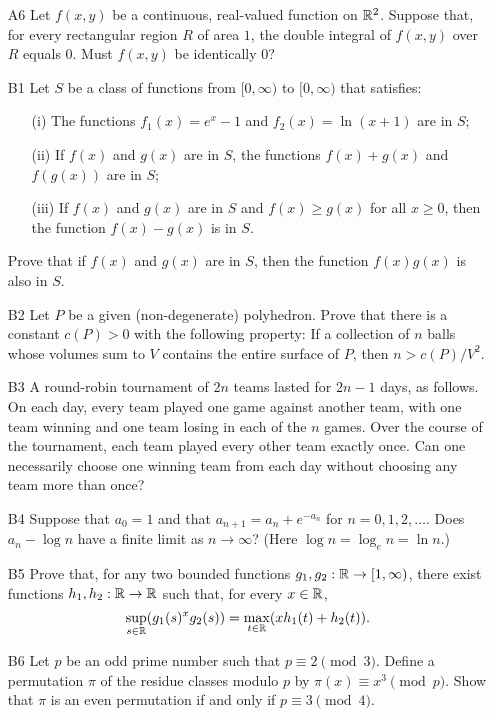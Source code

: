\documentclass[amssymb,twocolumn,pra,10pt,aps]{revtex4-1}
\begin{document}
\begin{itemize}
\item[A6]
Let $f(x,y)$ be a continuous, real-valued function on $\mathbb{R}^2$. Suppose that, for every
rectangular region $R$ of area $1$, the double integral of $f(x,y)$ over $R$ equals $0$.
Must $f(x,y)$ be identically 0?

\item[B1]
Let $S$ be a class of functions from $[0, \infty)$ to $[0, \infty)$ that satisfies:
\begin{itemize}
\item[(i)]
The functions $f_1(x) = e^x - 1$ and $f_2(x) = \ln(x+1)$ are in $S$;
\item[(ii)]
If $f(x)$ and $g(x)$ are in $S$, the functions $f(x) + g(x)$ and $f(g(x))$ are in $S$;
\item[(iii)]
If $f(x)$ and $g(x)$ are in $S$ and $f(x) \geq g(x)$ for all $x \geq 0$, then the function
$f(x) - g(x)$ is in $S$.
\end{itemize}
Prove that if $f(x)$ and $g(x)$ are in $S$, then the function $f(x) g(x)$ is also in $S$.

\item[B2]
Let $P$ be a given (non-degenerate) polyhedron. Prove that there is a constant $c(P) > 0$
with the following property: If a collection of $n$ balls whose volumes sum to $V$ contains
the entire surface of $P$, then $n > c(P) / V^2$.

\item[B3]
A round-robin tournament of $2n$ teams lasted for $2n-1$ days, as follows.
On each day, every team played one game against another team, with one team winning
and one team losing in each of the $n$ games. Over the course of the tournament,
each team played every other team exactly once. Can one necessarily choose
one winning team from each day without choosing any team more than once?

\item[B4]
Suppose that $a_0 = 1$ and that $a_{n+1} = a_n + e^{-a_n}$ for $n=0,1,2,\dots$. Does $a_n - \log n$
have a finite limit as $n \to \infty$? (Here $\log n = \log_e n = \ln n$.)

\item[B5]
Prove that, for any two bounded functions $g_1, g_2: \mathbb{R} \to [1, \infty)$,
there exist functions $h_1, h_2: \mathbb{R} \to \mathbb{R}$ such that, for every $x \in \mathbb{R}$,
\[
\sup_{s \in \mathbb{R}} (g_1(s)^x g_2(s))  = \max_{t \in \mathbb{R}} (x h_1(t) + h_2(t)).
\]

\item[B6]
Let $p$ be an odd prime number such that $p \equiv 2 \pmod{3}$. Define a permutation $\pi$ of the
residue classes modulo $p$ by $\pi(x) \equiv x^3 \pmod{p}$. Show that $\pi$ is an even permutation
if and only if $p \equiv 3 \pmod{4}$.

\end{itemize}
\end{document}
